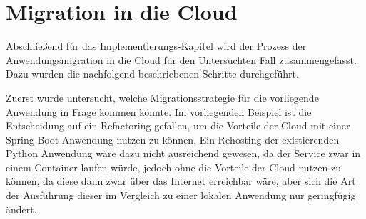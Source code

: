 


\section{Migration in die Cloud}
Abschließend für das Implementierungs-Kapitel wird der Prozess der Anwendungsmigration in die Cloud für den Untersuchten Fall zusammengefasst. Dazu wurden die nachfolgend beschriebenen Schritte durchgeführt.

Zuerst wurde untersucht, welche Migrationsstrategie für die vorliegende Anwendung in Frage kommen könnte. Im vorliegenden Beispiel ist die Entscheidung auf ein Refactoring gefallen, um die Vorteile der Cloud mit einer Spring Boot Anwendung nutzen zu können. Ein Rehosting der existierenden Python Anwendung wäre dazu nicht ausreichend gewesen, da der Service zwar in einem Container laufen würde, jedoch ohne die Vorteile der Cloud nutzen zu können, da diese dann zwar über das Internet erreichbar wäre, aber sich die Art der Ausführung dieser im Vergleich zu einer lokalen Anwendung nur geringfügig ändert.

